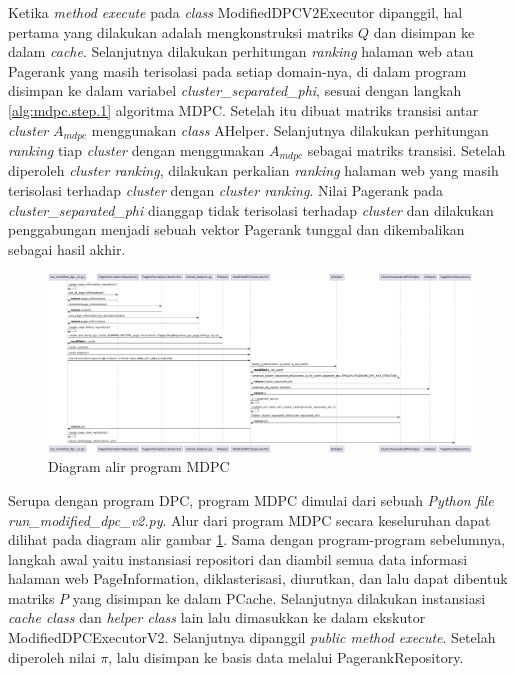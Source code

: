 Ketika \textit{method execute} pada \textit{class} ModifiedDPCV2Executor dipanggil, hal pertama yang dilakukan adalah mengkonstruksi matriks $Q$ dan disimpan ke dalam \textit{cache}. Selanjutnya dilakukan perhitungan \textit{ranking} halaman web atau Pagerank yang masih terisolasi pada setiap domain-nya, di dalam program disimpan ke dalam variabel \textit{cluster\_separated\_phi}, sesuai dengan langkah \ref{alg:mdpc.step.1} algoritma MDPC. Setelah itu dibuat matriks transisi antar \textit{cluster} $A_{mdpc}$ menggunakan \textit{class} AHelper. Selanjutnya dilakukan perhitungan \textit{ranking} tiap \textit{cluster} dengan menggunakan $A_{mdpc}$ sebagai matriks transisi. Setelah diperoleh \textit{cluster ranking}, dilakukan perkalian \textit{ranking} halaman web yang masih terisolasi terhadap \textit{cluster} dengan \textit{cluster ranking}. Nilai Pagerank pada \textit{cluster\_separated\_phi} dianggap tidak terisolasi terhadap \textit{cluster} dan dilakukan penggabungan menjadi sebuah vektor Pagerank tunggal dan dikembalikan sebagai hasil akhir.

\begin{figure}[H]
\centering
\includegraphics[width={\textheight}, height={\textwidth}, angle=270]{gambar/run_modified_dpc_v2_sequence_diagram}
\caption{Diagram alir program MDPC}
\label{gambar:run_modified_dpc_v2_sequence_diagram}
\end{figure}

Serupa dengan program DPC, program MDPC dimulai dari sebuah \textit{Python file run\_modified\_dpc\_v2.py}. Alur dari program MDPC secara keseluruhan dapat dilihat pada diagram alir gambar \ref{gambar:run_modified_dpc_v2_sequence_diagram}. Sama dengan program-program sebelumnya, langkah awal yaitu instansiasi repositori dan diambil semua data informasi halaman web PageInformation, diklasterisasi, diurutkan, dan lalu dapat dibentuk matriks $P$ yang disimpan ke dalam PCache. Selanjutnya dilakukan instansiasi \textit{cache class} dan \textit{helper class} lain lalu dimasukkan ke dalam ekskutor ModifiedDPCExecutorV2. Selanjutnya dipanggil \textit{public method execute}. Setelah diperoleh nilai $\pi$, lalu disimpan ke basis data melalui PagerankRepository.

